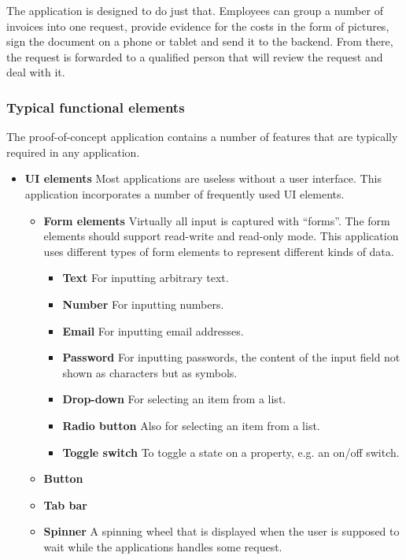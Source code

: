 The application is designed to do just that. Employees can group a number of invoices into one request, provide evidence for the costs in the form of pictures, sign the document on a phone or tablet and send it to the backend. From there, the request is forwarded to a qualified person that will review the request and deal with it. 

\subsubsection{Typical functional elements}

The proof-of-concept application contains a number of features that are typically required in any application.

\begin{itemize}
    \item \textbf{UI elements} Most applications are useless without a user interface. This application incorporates a number of frequently used UI elements.
    \begin{itemize}
        \item \textbf{Form elements} Virtually all input is captured with ``forms''. The form elements should support read-write and read-only mode. This application uses different types of form elements to represent different kinds of data. 
        \begin{itemize}
            \item \textbf{Text} For inputting arbitrary text.
            \item \textbf{Number} For inputting numbers.
            \item \textbf{Email} For inputting email addresses.
            \item \textbf{Password} For inputting passwords, the content of the input field not shown as characters but as symbols. 
            \item \textbf{Drop-down} For selecting an item from a list.
            \item \textbf{Radio button} Also for selecting an item from a list.
            \item \textbf{Toggle switch} To toggle a state on a property, e.g. an on/off switch.
        \end{itemize}
        \item \textbf{Button} 
        \item \textbf{Tab bar}  
        \item \textbf{Spinner} A spinning wheel that is displayed when the user is supposed to wait while the applications handles some request.

\end{itemize}
\end{itemize}
